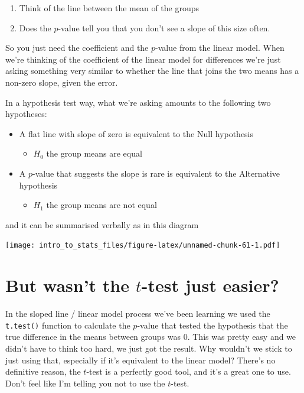\documentclass[
]{book}
\providecommand{\tightlist}{%
  \setlength{\itemsep}{0pt}\setlength{\parskip}{0pt}}
\begin{document}
\begin{enumerate}
\def\labelenumi{\arabic{enumi}.}
\tightlist
\item
  Think of the line between the mean of the groups
\item
  Does the \(p\)-value tell you that you don't see a slope of this size often.
\end{enumerate}

So you just need the coefficient and the \(p\)-value from the linear model.
When we're thinking of the coefficient of the linear model for differences we're just asking something very similar to whether the line that joins the two means has a non-zero slope, given the error.

In a hypothesis test way, what we're asking amounts to the following two hypotheses:

\begin{itemize}
\tightlist
\item
  A flat line with slope of zero is equivalent to the Null hypothesis

  \begin{itemize}
  \tightlist
  \item
    \(H_{0}\) the group means are equal
  \end{itemize}
\item
  A \(p\)-value that suggests the slope is rare is equivalent to the Alternative hypothesis

  \begin{itemize}
  \tightlist
  \item
    \(H_{1}\) the group means are not equal
  \end{itemize}
\end{itemize}

and it can be summarised verbally as in this diagram

\texttt{[image: intro\_to\_stats\_files/figure-latex/unnamed-chunk-61-1.pdf]}

\hypertarget{but-wasnt-the-t-test-just-easier}{%
\section{\texorpdfstring{But wasn't the \(t\)-test just easier?}{But wasn't the t-test just easier?}}\label{but-wasnt-the-t-test-just-easier}}

In the sloped line / linear model process we've been learning we used the \texttt{t.test()} function to calculate the \(p\)-value that tested the hypothesis that the true difference in the means between groups was 0. This was pretty easy and we didn't have to think too hard, we just got the result. Why wouldn't we stick to just using that, especially if it's equivalent to the linear model? There's no definitive reason, the \(t\)-test is a perfectly good tool, and it's a great one to use. Don't feel like I'm telling you not to use the \(t\)-test.
\end{document}
